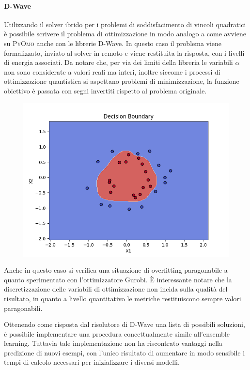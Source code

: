 \documentclass[12pt]{article}
\begin{document}
\paragraph{D-Wave} Utilizzando il solver ibrido per i problemi di soddisfacimento di vincoli quadratici è possibile scrivere il problema di ottimizzazione in modo analogo a come avviene su \textsc{PyOmo} anche con le librerie D-Wave.
In questo caso il problema viene formalizzato, inviato al solver in remoto e viene restituita la risposta, con i livelli di energia associati.
Da notare che, per via dei limiti della libreria le variabili $\alpha$ non sono considerate a valori reali ma interi,
inoltre siccome i processi di ottimizzazione quantistica si aspettano problemi di minimizzazione, la funzione obiettivo è passata con segni invertiti rispetto al problema originale.

\begin{figure}[H]
  \centering
  \includegraphics[width=\linewidth]{img/decision_boundary_dwave.png}
\end{figure}

Anche in questo caso si verifica una situazione di overfitting paragonabile a quanto sperimentato con l'ottimizzatore Gurobi.
È interessante notare che la discretizzazione delle variabili di ottimizzazione non incida sulla qualità del risultato, 
in quanto a livello quantitativo le metriche restituiscono sempre valori paragonabili.

Ottenendo come risposta dal risolutore di D-Wave una lista di possibili soluzioni,
è possibile implementare una procedura concettualmente simile all'ensemble learning. 
Tuttavia tale implementazione non ha riscontrato vantaggi nella predizione di nuovi esempi, 
con l'unico risultato di aumentare in modo sensibile i tempi di calcolo necessari per inizializzare i diversi modelli.
\end{document}
